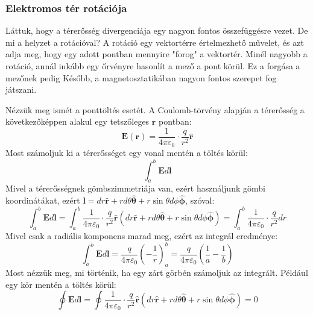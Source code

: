 \documentclass[../main.tex]{subfiles}
\begin{document}
\subsubsection{Elektromos tér rotációja}
Láttuk, hogy a térerősség divergenciája egy nagyon fontos összefüggésre vezet. De mi a helyzet a rotációval? A rotáció egy vektortérre értelmezhető művelet, és azt adja meg, hogy egy adott pontban
mennyire "forog" a vektortér. Minél nagyobb a rotáció, annál inkább egy őrvényre hasonlít a mező a pont körül. Ez a forgása a mezőnek pedig Később, a magnetosztatikában nagyon fontos szerepet fog játszani.

Nézzük meg ismét a ponttöltés esetét. A Coulomb-törvény alapján a térerősség a következőképpen alakul egy tetszőleges $\mathbf{r}$ pontban:
\begin{equation}
    \mathbf{E}(\mathbf{r}) = \frac{1}{4 \pi \varepsilon_0} \cdot \frac{q}{r^2} \mathbf{\hat{r}}
\end{equation}
Most számoljuk ki a térerősséget egy vonal mentén a töltés körül:
\begin{equation}
    \int_{a}^{b} \mathbf{E} d\mathbf{l}
\end{equation}
Mivel a térerősségnek gömbszimmetriája van, ezért használjunk gömbi koordinátákat, ezért $\mathbf{l} = dr \mathbf{\hat{r}} + r d\theta \mathbf{\hat{\theta}} + r \sin\theta d\phi \mathbf{\hat{\phi}}$, szóval:
\begin{equation}
    \int_{a}^{b} \mathbf{E} d\mathbf{l} = \int_{a}^{b} \frac{1}{4 \pi \varepsilon_0} \cdot \frac{q}{r^2} \mathbf{\hat{r}} (dr \mathbf{\hat{r}} + r d\theta \mathbf{\hat{\theta}} + r \sin\theta d\phi \mathbf{\hat{\phi}}) = \int_{a}^{b} \frac{1}{4 \pi \varepsilon_0} \cdot \frac{q}{r^2} dr
\end{equation}
Mivel csak a radiális komponens marad meg, ezért az integrál eredménye:
\begin{equation}
    \int_{a}^{b} \mathbf{E} d\mathbf{l} = \frac{q}{4 \pi \varepsilon_0} \left( -\frac{{1}}{r} \right)_{a}^{b} = \frac{q}{4 \pi \varepsilon_0} \left( \frac{1}{a} - \frac{1}{b} \right)
\end{equation}
Most nézzük meg, mi történik, ha egy zárt görbén számoljuk az integrált. Például egy kör mentén a töltés körül:
\begin{equation}
    \oint \mathbf{E} d\mathbf{l} = \oint \frac{1}{4 \pi \varepsilon_0} \cdot \frac{q}{r^2} \mathbf{\hat{r}} (dr \mathbf{\hat{r}} + r d\theta \mathbf{\hat{\theta}} + r \sin\theta d\phi \mathbf{\hat{\phi}}) = 0
\end{equation}
\end{document}
